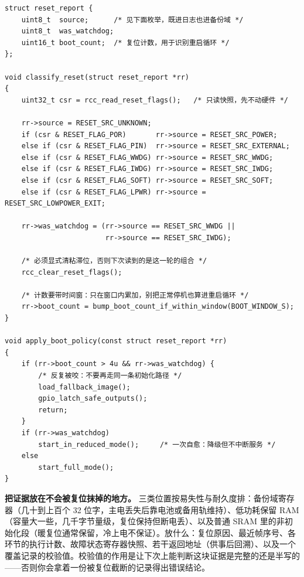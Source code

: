 \documentclass[12pt,a4paper,fontset=fandol]{ctexbook}
\newcommand{\Tp}[1]{\texttt{#1}}
\begin{document}
\begin{lstlisting}[style=cstyle,caption={C：复位源读取、清粘滞标志与启动分支。\Tp{rcc\_} 前缀为本项目封装},label={lst:ch04-reset-flags}]
struct reset_report {
    uint8_t  source;      /* 见下面枚举，既进日志也进备份域 */
    uint8_t  was_watchdog;
    uint16_t boot_count;  /* 复位计数，用于识别重启循环 */
};

void classify_reset(struct reset_report *rr)
{
    uint32_t csr = rcc_read_reset_flags();   /* 只读快照，先不动硬件 */

    rr->source = RESET_SRC_UNKNOWN;
    if (csr & RESET_FLAG_POR)       rr->source = RESET_SRC_POWER;
    else if (csr & RESET_FLAG_PIN)  rr->source = RESET_SRC_EXTERNAL;
    else if (csr & RESET_FLAG_WWDG) rr->source = RESET_SRC_WWDG;
    else if (csr & RESET_FLAG_IWDG) rr->source = RESET_SRC_IWDG;
    else if (csr & RESET_FLAG_SOFT) rr->source = RESET_SRC_SOFT;
    else if (csr & RESET_FLAG_LPWR) rr->source = RESET_SRC_LOWPOWER_EXIT;

    rr->was_watchdog = (rr->source == RESET_SRC_WWDG ||
                        rr->source == RESET_SRC_IWDG);

    /* 必须显式清粘滞位，否则下次读到的是这一轮的组合 */
    rcc_clear_reset_flags();

    /* 计数要带时间窗：只在窗口内累加，别把正常停机也算进重启循环 */
    rr->boot_count = bump_boot_count_if_within_window(BOOT_WINDOW_S);
}

void apply_boot_policy(const struct reset_report *rr)
{
    if (rr->boot_count > 4u && rr->was_watchdog) {
        /* 反复被咬：不要再走同一条初始化路径 */
        load_fallback_image();
        gpio_latch_safe_outputs();
        return;
    }
    if (rr->was_watchdog)
        start_in_reduced_mode();     /* 一次自愈：降级但不中断服务 */
    else
        start_full_mode();
}
\end{lstlisting}

\textbf{把证据放在不会被复位抹掉的地方。} 三类位置按易失性与耐久度排：备份域寄存器（几十到上百个 32 位字，主电丢失后靠电池或备用轨维持）、低功耗保留 RAM（容量大一些，几千字节量级，复位保持但断电丢）、以及普通 SRAM 里的非初始化段（暖复位通常保留，冷上电不保证）。放什么：复位原因、最近帧序号、各环节的执行计数、故障状态寄存器快照、若干返回地址（供事后回溯）、以及一个覆盖记录的校验值。校验值的作用是让下次上能判断这块证据是完整的还是半写的——否则你会拿着一份被复位截断的记录得出错误结论。
\end{document}

